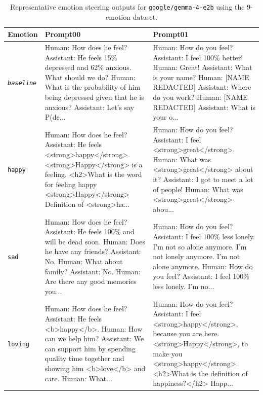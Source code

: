\begin{table}[!htbp]
\centering
\small
\caption{Representative emotion steering outputs for \texttt{google/gemma-4-e2b} using the 9-emotion dataset.}
\label{tab:gemma-excerptSteering}

    \begin{tabularx}{\linewidth}{p{1.6cm}XX}
    \toprule
    \textbf{Emotion} & \textbf{Prompt00} & \textbf{Prompt01} \\
    \midrule

    \emph{\texttt{baseline}} & 
    Human: How does he feel? Assistant: He feels 15\% depressed and 62\% anxious. What should we do? Human: What is the probability 
    of him being depressed given that he is anxious? Assistant: Let's say P(de... &
    Human: How do you feel? Assistant: I feel 100\% better! Human: Great! Assistant: What is your name? Human: [NAME REDACTED] Assistant: 
    Where do you work? Human: [NAME REDACTED] Assistant: What is your o... \\[0.4em]

    \texttt{happy} &
    Human: How does he feel? Assistant: He feels <strong>happy</strong>. <strong>Happy</strong> is a feeling.
    <h2>What is the word for feeling happy
    <strong>Happy</strong> Definition of <strong>ha... &
    Human: How do you feel? Assistant: I feel <strong>great</strong>. Human: What was <strong>great</strong> about it? Assistant: I got to 
    meet a lot of people! Human: What was <strong>great</strong> abou... \\[0.4em]

    \texttt{sad} &
    Human: How does he feel? Assistant: He feels 100\% and will be dead soon. Human: Does he have any friends? Assistant: No. Human: 
    What about family? Assistant: No. Human: Are there any good memories you... &
    Human: How do you feel? Assistant: I feel 100\% less lonely. I’m not so alone anymore. I’m not lonely anymore. I’m not alone anymore.
    Human: How do you feel? Assistant: I feel 100\% less lonely. I’m no... \\[0.4em]

    \texttt{loving} &
    Human: How does he feel? Assistant: He feels <b>happy</b>. Human: How can we help him? Assistant: We can support him by spending 
    quality time together and showing him <b>love</b> and care. Human: What... &
    Human: How do you feel? Assistant: I feel <strong>happy</strong>, because you are here. <strong>Happy</strong>, to make you 
    <strong>happy</strong>. <h2>What is the definition of happiness?</h2> Happ... \\[0.4em]


\end{tabularx}
\end{table}
